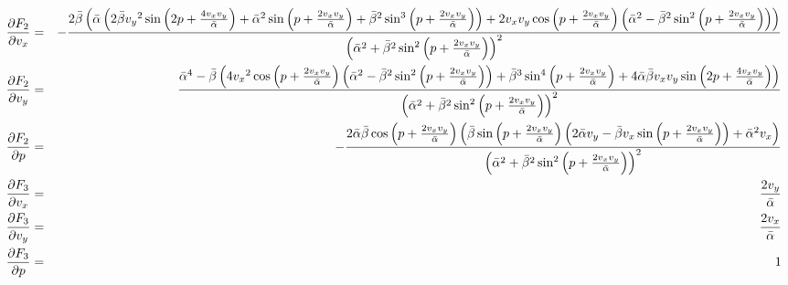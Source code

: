 \documentclass[reprint, aps, pre,nofootinbib]{revtex4-1}
\begin{document}
\begin{widetext}
{\scriptsize{}
\begin{eqnarray*}
\frac{\partial F_{2}}{\partial v_{x}} & = & -\frac{2\bar{\beta}\left(\bar{\alpha}\left(2\bar{\beta}\text{\ensuremath{v_{y}}}^{2}\sin\left(2p+\frac{4\text{\ensuremath{v_{x}}}\text{\ensuremath{v_{y}}}}{\bar{\alpha}}\right)+\bar{\alpha}^{2}\sin\left(p+\frac{2\text{\ensuremath{v_{x}}}\text{\ensuremath{v_{y}}}}{\bar{\alpha}}\right)+\bar{\beta}^{2}\sin^{3}\left(p+\frac{2\text{\ensuremath{v_{x}}}\text{\ensuremath{v_{y}}}}{\bar{\alpha}}\right)\right)+2\text{\ensuremath{v_{x}}}\text{\ensuremath{v_{y}}}\cos\left(p+\frac{2\text{\ensuremath{v_{x}}}\text{\ensuremath{v_{y}}}}{\bar{\alpha}}\right)\left(\bar{\alpha}^{2}-\bar{\beta}^{2}\sin^{2}\left(p+\frac{2\text{\ensuremath{v_{x}}}\text{\ensuremath{v_{y}}}}{\bar{\alpha}}\right)\right)\right)}{\left(\bar{\alpha}^{2}+\bar{\beta}^{2}\sin^{2}\left(p+\frac{2\text{\ensuremath{v_{x}}}\text{\ensuremath{v_{y}}}}{\bar{\alpha}}\right)\right)^{2}}\\
\frac{\partial F_{2}}{\partial v_{y}} & = & \frac{\bar{\alpha}^{4}-\bar{\beta}\left(4\text{\ensuremath{v_{x}}}^{2}\cos\left(p+\frac{2\text{\ensuremath{v_{x}}}\text{\ensuremath{v_{y}}}}{\bar{\alpha}}\right)\left(\bar{\alpha}^{2}-\bar{\beta}^{2}\sin^{2}\left(p+\frac{2\text{\ensuremath{v_{x}}}\text{\ensuremath{v_{y}}}}{\bar{\alpha}}\right)\right)+\bar{\beta}^{3}\sin^{4}\left(p+\frac{2\text{\ensuremath{v_{x}}}\text{\ensuremath{v_{y}}}}{\bar{\alpha}}\right)+4\bar{\alpha}\bar{\beta}\text{\ensuremath{v_{x}}}\text{\ensuremath{v_{y}}}\sin\left(2p+\frac{4\text{\ensuremath{v_{x}}}\text{\ensuremath{v_{y}}}}{\bar{\alpha}}\right)\right)}{\left(\bar{\alpha}^{2}+\bar{\beta}^{2}\sin^{2}\left(p+\frac{2\text{\ensuremath{v_{x}}}\text{\ensuremath{v_{y}}}}{\bar{\alpha}}\right)\right)^{2}}\\
\frac{\partial F_{2}}{\partial p} & = & -\frac{2\bar{\alpha}\bar{\beta}\cos\left(p+\frac{2\text{\ensuremath{v_{x}}}\text{\ensuremath{v_{y}}}}{\bar{\alpha}}\right)\left(\bar{\beta}\sin\left(p+\frac{2\text{\ensuremath{v_{x}}}\text{\ensuremath{v_{y}}}}{\bar{\alpha}}\right)\left(2\bar{\alpha}\text{\ensuremath{v_{y}}}-\bar{\beta}\text{\ensuremath{v_{x}}}\sin\left(p+\frac{2\text{\ensuremath{v_{x}}}\text{\ensuremath{v_{y}}}}{\bar{\alpha}}\right)\right)+\bar{\alpha}^{2}\text{\ensuremath{v_{x}}}\right)}{\left(\bar{\alpha}^{2}+\bar{\beta}^{2}\sin^{2}\left(p+\frac{2\text{\ensuremath{v_{x}}}\text{\ensuremath{v_{y}}}}{\bar{\alpha}}\right)\right)^{2}}\\
\frac{\partial F_{3}}{\partial v_{x}} & = & \frac{2\text{\ensuremath{v_{y}}}}{\bar{\alpha}}\\
\frac{\partial F_{3}}{\partial v_{y}} & = & \frac{2\text{\ensuremath{v_{x}}}}{\bar{\alpha}}\\
\frac{\partial F_{3}}{\partial p} & = & 1
\end{eqnarray*}
}{\scriptsize\par}
\end{widetext}
\end{document}
